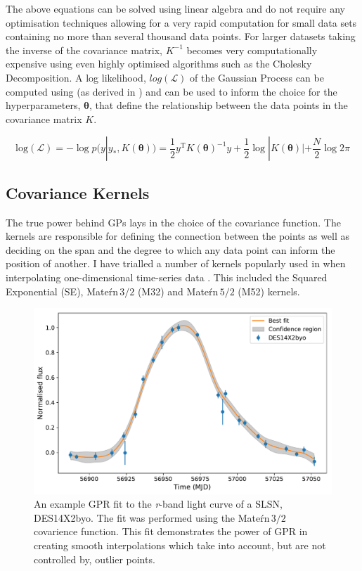 The above equations can be solved using linear algebra and do not require any optimisation techniques allowing for a very rapid computation for small data sets containing no more than several thousand data points. For larger datasets taking the inverse of the covariance matrix, $K^{-1}$ becomes very computationally expensive using even highly optimised algorithms such as the Cholesky Decomposition. A log likelihood, $log(\mathcal{L})$ of the Gaussian Process can be computed using  (as derived in \citet{Rasmussen2006}) and can be used to inform the choice for the hyperparameters, $\mathbf{\theta}$, that define the relationship between the data points in the covariance matrix $K$.

\begin{equation} \label{eg:logGP}
\mathrm{log(\mathcal{L})} = - \log p(y|y_*, K(\mathbf{\theta})) = \frac{1}{2} y^{\mathrm{T}} K(\mathbf{\theta})^{-1} y + \frac{1}{2} \log |K(\mathbf{\theta})| + \frac{N}{2} \log 2 \pi
\end{equation}

\subsection{Covariance Kernels} \label{sec:GPkernels}
The true power behind GPs lays in the choice of the covariance function. The kernels are responsible for defining the connection between the points as well as deciding on the span and the degree to which any data point can inform the position of another. I have trialled a number of kernels popularly used in when interpolating one-dimensional time-series data \citep{Rasmussen2006}. This included the Squared Exponential (SE), Mate\'rn\,$3/2$ (M32) and Mate\'rn\,$5/2$ (M52) kernels.

\begin{figure}
  \centering
  \includegraphics[width=\textwidth]{Figures/Chapter3/GP_Example}
  \caption{An example GPR fit to the \textit{r}-band light curve of a SLSN, DES14X2byo. The fit was performed using the Mate\'rn\,$3/2$ covarience function. This fit demonstrates the power of GPR in creating smooth interpolations which take into account, but are not controlled by, outlier points.}
  \label{fig:GPKernels}
\end{figure}

